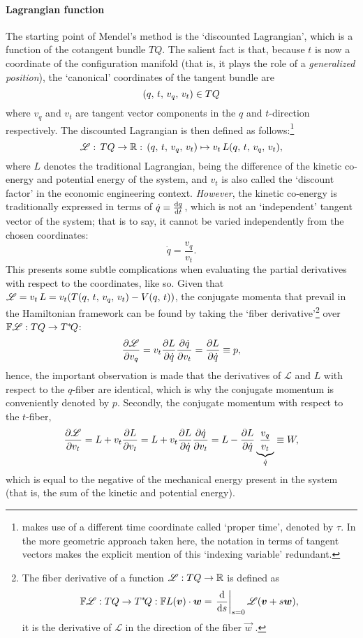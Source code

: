 \paragraph{Lagrangian function} The starting point of Mendel's method is the `discounted Lagrangian', which is a function of the cotangent bundle $TQ$. The salient fact is that, because $t$ is now a coordinate of the configuration manifold (that is, it plays the role of a \emph{generalized position}), the `canonical' coordinates of the tangent bundle are
$$ \qty(q,\,t,\,v_q,\,v_t) \in TQ$$
where $v_q$ and $v_t$ are tangent vector components in the $q$ and $t$-direction respectively. The discounted Lagrangian is then defined as follows:\footnote{\citet{Mendel2021} makes use of a different time coordinate called `proper time', denoted by $\tau$. In the more geometric approach taken here, the notation in terms of tangent vectors makes the explicit mention of this `indexing variable' redundant.}
$$ \mathscr{L}:\,TQ\to\mathbb{R}:\,\qty(q,\,t,\,v_q,\,v_t) \mapsto v_t\,L(q,\,t,\,v_q,\,v_t), $$
where $L$ denotes the traditional Lagrangian, being the difference of the kinetic co-energy and potential energy of the system, and $v_t$ is also called the `discount factor' in the economic engineering context. \emph{However}, the kinetic co-energy is traditionally expressed in terms of $\dot{q} = \dv{q}{t}$, which is not an `independent' tangent vector of the system; that is to say, it cannot be varied independently from the chosen coordinates:
$$ \dot{q} = \frac{v_q}{v_t}. $$
This presents some subtle complications when evaluating the partial derivatives with respect to the coordinates, like so. Given that $\mathscr{L} = v_t\,L = v_t\qty(T(q,\,t,\,v_q,\,v_t) - V(q,\,t))$, the conjugate momenta that prevail in the Hamiltonian framework can be found by taking the `fiber derivative'\footnote{The fiber derivative of a function $\mathscr{L}: TQ \to \mathbb{R}$ is defined as $$ \mathbb{F}\mathscr{L}: TQ \to \cotangent{Q}: \mathbb{F}\lag(\vec{v})\cdot\vec{w} = \left.\dv{}{s}\right|_{s = 0} \mathscr{L}(\vec{v} + s\vec{w}), $$ it is the derivative of $\mathscr{L}$ in the direction of the fiber $\vec{w}$ \cite[p. 179]{Marsden1998}.} over $\mathbb{F}\mathscr{L}: TQ \to T^*\!Q$: \cite{Abraham1978}
$$ \pdv{\mathscr{L}}{v_q} = v_t\pdv{L}{\dot{q}}\pdv{\dot{q}}{v_t} = \pdv{L}{\dot{q}}  \equiv p,$$
hence, the important observation is made that the derivatives of $\mathscr{L}$ and $L$ with respect to the $q$-fiber are identical, which is why the conjugate momentum is conveniently denoted by $p$. Secondly, the conjugate momentum with respect to the $t$-fiber,
$$ \pdv{\mathscr{L}}{v_t} = L + v_t\pdv{L}{v_t} = L + v_t\pdv{L}{\dot{q}}\pdv{\dot{q}}{v_t} = L - \pdv{L}{\dot{q}}\underbrace{\frac{v_q}{v_t}}_{\dot{q}} \equiv W, $$
which is equal to the negative of the mechanical energy present in the system (that is, the sum of the kinetic and potential energy).

